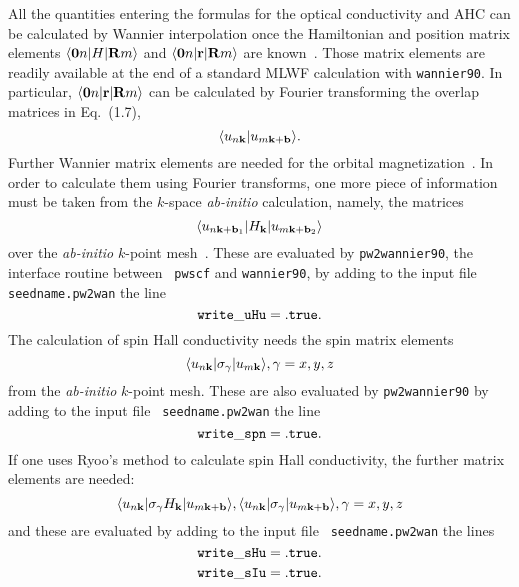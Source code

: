 All the quantities entering the formulas for the optical conductivity
and AHC can be calculated by Wannier interpolation once the
Hamiltonian and position matrix elements $\langle {\bf 0}n\vert H\vert
{\bf R}m\rangle$ and $\langle {\bf 0}n\vert {\bf r}\vert {\bf
  R}m\rangle$ are known~\cite{wang-prb06,yates-prb07}.  Those matrix
elements are readily available at the end of a standard MLWF
calculation with {\tt wannier90}. In particular, $\langle {\bf
  0}n\vert {\bf r}\vert {\bf R}m\rangle$ can be calculated by Fourier
transforming the overlap matrices in Eq.~(1.7),
%
$$\langle u_{n{\bf k}}\vert u_{m{\bf k}+{\bf b}}\rangle.
$$
%
Further Wannier matrix elements are needed for the orbital
magnetization~\cite{lopez-prb12}. In order to calculate them using
Fourier transforms, one more piece of information must be taken from
the $k$-space {\it ab-initio} calculation, namely, the matrices
%
$$\langle u_{n{\bf k}+{\bf b}_1}\vert
H_{\bf k}\vert u_{m{\bf k}+{\bf b}_2}\rangle
$$
%
over the {\it ab-initio} $k$-point mesh~\cite{lopez-prb12}.  These are
evaluated by {\tt pw2wannier90}, the interface routine between {\tt
  pwscf} and {\tt wannier90}, by adding to the input file {\tt
  seedname.pw2wan} the line
%
$${\tt
write\_uHu = .true.
}
$$
The calculation of spin Hall conductivity needs the 
spin matrix elements
%
$$\langle u_{n{\bf k}}\vert \sigma_\gamma \vert u_{m{\bf k}}\rangle, 
\gamma = x, y, z
$$
% 
from the {\it ab-initio} $k$-point mesh. These are also 
evaluated by {\tt pw2wannier90} by adding to the input file {\tt
seedname.pw2wan} the line
%
$${\tt
	write\_spn = .true.
}
$$
If one uses Ryoo's method to calculate spin Hall conductivity, the further matrix elements are needed:
%
$$\langle u_{n{\bf k}}\vert
\sigma_\gamma H_{\bf k}\vert u_{m{\bf k}+{\bf b}}\rangle, \langle u_{n{\bf k}}\vert
\sigma_\gamma \vert u_{m{\bf k}+{\bf b}}\rangle,
\gamma = x, y, z
$$
%
and these are evaluated by adding to the input file {\tt
seedname.pw2wan} the lines
%
$${\tt
	write\_sHu = .true.
}
$$
$$
{\tt
	write\_sIu = .true.
}
$$

